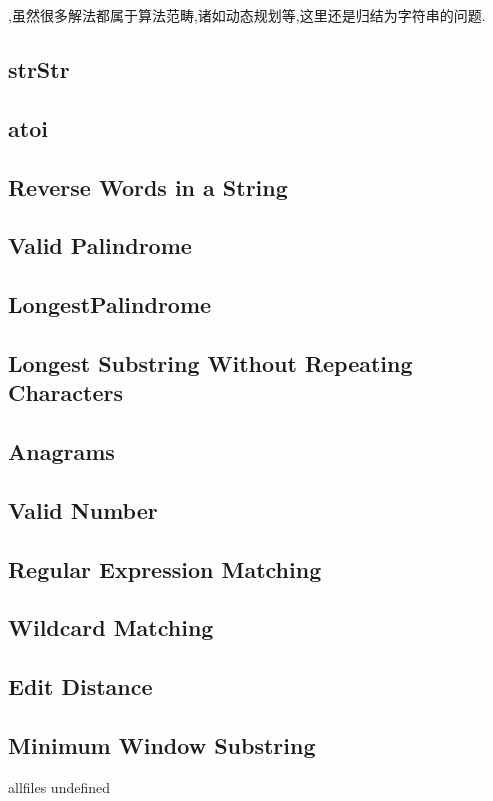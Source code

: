\documentclass{article}
\begin{document}
\begin{CJK}{UTF8}{gbsn}     %

\else
    
,虽然很多解法都属于算法范畴,诸如动态规划等,这里还是归结为字符串的问题.


\subsection{strStr}

\subsection{atoi}

\subsection{Reverse Words in a String}

\subsection{Valid Palindrome}

\subsection{LongestPalindrome}

\subsection{Longest Substring Without Repeating Characters}

\subsection{Anagrams}

\subsection{Valid Number}

\subsection{Regular Expression Matching}

\subsection{Wildcard Matching}

\subsection{Edit Distance}

\subsection{Minimum Window Substring}


\fi

\ifx allfiles undefined
\end{CJK}
\end{document}
